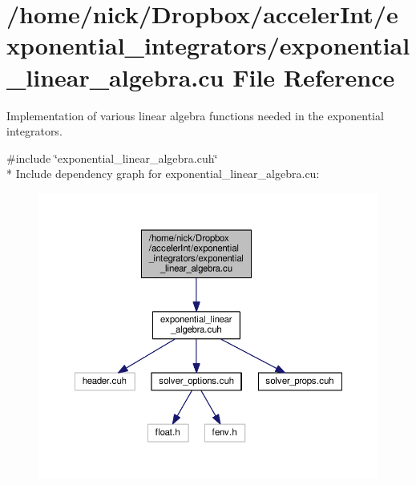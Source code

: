 \hypertarget{exponential__linear__algebra_8cu}{}\section{/home/nick/\+Dropbox/acceler\+Int/exponential\+\_\+integrators/exponential\+\_\+linear\+\_\+algebra.cu File Reference}
\label{exponential__linear__algebra_8cu}


Implementation of various linear algebra functions needed in the exponential integrators.  


{\ttfamily \#include \char`\"{}exponential\+\_\+linear\+\_\+algebra.\+cuh\char`\"{}}\\*
Include dependency graph for exponential\+\_\+linear\+\_\+algebra.\+cu\+:
\nopagebreak
\begin{figure}[H]
\begin{center}
\leavevmode
\includegraphics[width=350pt]{exponential__linear__algebra_8cu__incl}
\end{center}
\end{figure}
